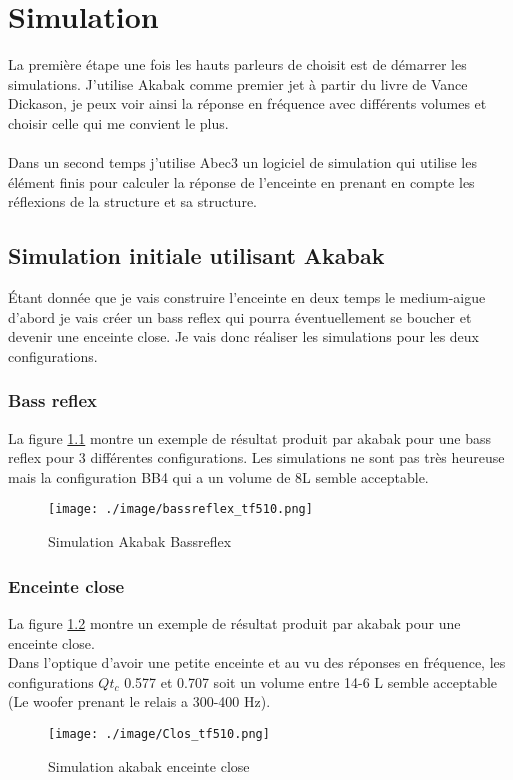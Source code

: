 \documentclass[a4paper,english]{report}
\begin{document}
			\chapter{Simulation}
			La première étape une fois les hauts parleurs de choisit est de démarrer les simulations. J'utilise Akabak comme premier jet à partir du livre de Vance Dickason, je peux voir ainsi la réponse en fréquence  avec différents volumes et choisir celle qui me convient le plus.\\ 
			\\
			Dans un second temps j'utilise Abec3 un logiciel de simulation qui utilise les élément finis pour calculer la réponse de l'enceinte en prenant en compte les réflexions de la structure et sa structure.\\
			

					
			\section{Simulation initiale utilisant Akabak} 
			Étant donnée que je vais construire l'enceinte en deux temps le medium-aigue d'abord je vais créer un bass reflex qui pourra éventuellement se boucher et devenir une enceinte close. Je vais donc réaliser les simulations pour les deux configurations.\\
			
			
			
			\subsection{Bass reflex}
			La figure \ref{simubassr} montre un exemple de résultat produit par akabak pour une bass reflex pour 3 différentes configurations. Les simulations ne sont pas très heureuse mais la configuration BB4 qui a un volume de 8L semble acceptable.\\
 				\begin{figure}[H]
 					\centering
 					\texttt{[image: ./image/bassreflex\_tf510.png]}
 					\label{simubassr}
 					\caption{Simulation Akabak Bassreflex}
 				\end{figure}
 			
 			\subsection{Enceinte close}
 			La figure \ref{simuclos} montre un exemple de résultat produit par akabak pour une enceinte close.\\ Dans l'optique d'avoir une petite enceinte et au vu des réponses en fréquence, les configurations $Qt_c$ 0.577 et 0.707 soit un volume entre 14-6 L semble acceptable (Le woofer prenant le relais a 300-400 Hz). 
 				\begin{figure}[H]
 					\centering
 					\texttt{[image: ./image/Clos\_tf510.png]}
 					\label{simuclos}
 					\caption{Simulation akabak enceinte close}
 				\end{figure}				
\end{document}
